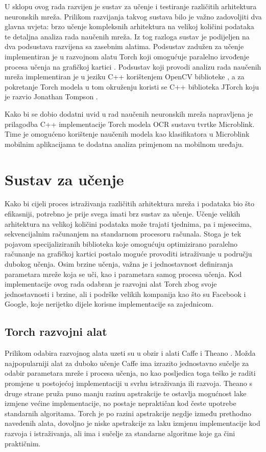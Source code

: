 \documentclass[lmodern, utf8, diplomski, numeric]{fer}
\begin{document}
U sklopu ovog rada razvijen je sustav za učenje i testiranje različitih arhitektura neuronskih mreža. Prilikom razvijanja takvog sustava bilo je važno zadovoljiti dva glavna uvjeta: brzo učenje kompleksnih arhitektura na velikoj količini podataka te detaljna analiza rada naučenih mreža. Iz tog razloga sustav je podijeljen na dva podsustava razvijena sa zasebnim alatima. Podsustav zadužen za učenje implementiran je u razvojnom alatu Torch koji omogućuje paralelno izvođenje procesa učenja na grafičkoj kartici \cite{collobert2011torch}. Podsustav koji provodi analizu rada naučenih mreža implementiran je u jeziku C++ korištenjem OpenCV biblioteke \cite{bradski2000opencv}, a za pokretanje Torch modela u tom okruženju koristi se C++ biblioteka JTorch koju je razvio Jonathan Tompson \cite{tompson2013jtorch}.

Kako bi se dobio dodatni uvid u rad naučenih neuronskih mreža napravljena je prilagodba C++ implementacije Torch modela OCR sustavu tvrtke Microblink. Time je omogućeno korištenje naučenih modela kao klasifikatora u Microblink mobilnim aplikacijama te dodatna analiza primjenom na mobilnom uređaju.

\section{Sustav za učenje}

Kako bi cijeli proces istraživanja različitih arhitektura mreža i podataka bio što efikasniji, potrebno je prije svega imati brz sustav za učenje. Učenje velikih arhitektura na velikoj količini podataka može trajati tjednima, pa i mjesecima, sekvencijalnim računanjem na standarnom procesoru računala. Stoga je tek pojavom specijaliziranih biblioteka koje omogućuju optimizirano paralelno računanje na grafičkoj kartici postalo moguće provoditi istraživanje u području dubokog učenja. 
Osim brzine učenja, važna je i jednostavnost definiranja parametara mreže koja se uči, kao i parametara samog procesa učenja. Kod implementacije ovog rada odabran je razvojni alat Torch zbog svoje jednostavnosti i brzine, ali i podrške velikih kompanija kao što su Facebook i Google, koje nerijetko dijele korisne implementacije sa zajednicom. 

\subsection{Torch razvojni alat}

Prilikom odabira razvojnog alata uzeti su u obzir i alati Caffe i Theano \cite{jia2014caffe}\cite{bergstra2010theano}. Možda najpopularniji alat za duboko učenje Caffe ima izrazito jednostavno sučelje za odabir parametara mreže i procesa učenja, no kao posljedica toga teško je raditi promjene u postojećoj implementaciji u svrhu istraživanja ili razvoja. Theano s druge strane pruža puno manju razinu apstrakcije te ostavlja mogućnost lake izmjene većine implementacije, no postaje nepraktičan kod česte upotrebe standarnih algoritama.
Torch je po razini apstrakcije negdje između prethodno navedenih alata, dovoljno je niske apstrakcije za laku izmjenu implementacije kod razvoja i istraživanja, ali ima i sučelje za standarne algoritme koje ga čini praktičnim. 
\end{document}

